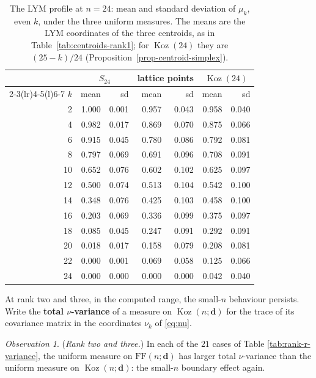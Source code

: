 \documentclass[11pt, a4paper, abstract=yes]{scrartcl}
\theoremstyle{definition}
\theoremstyle{remark}
\theoremstyle{plain}
\newcommand{\vek}[1]{\boldsymbol{#1}}
\theoremstyle{remark}
\newtheorem{observation}[definition]{Observation}
\theoremstyle{plain}
\newcommand{\Koz}{\operatorname{Koz}}
\newcommand{\FF}{\mathrm{FF}}
\begin{document}
\begin{table}[htbp]\centering\small
\begin{tabular}{@{}rrrrrrr@{}}
\toprule
 & \multicolumn{2}{c}{\(S_{24}\)} & \multicolumn{2}{c}{lattice points} & \multicolumn{2}{c}{\(\Koz(24)\)}\\
\cmidrule(lr){2-3}\cmidrule(lr){4-5}\cmidrule(l){6-7}
\(k\) & mean & sd & mean & sd & mean & sd\\
\midrule
2 & 1.000 & 0.001 & 0.957 & 0.043 & 0.958 & 0.040\\
4 & 0.982 & 0.017 & 0.869 & 0.070 & 0.875 & 0.066\\
6 & 0.915 & 0.045 & 0.780 & 0.086 & 0.792 & 0.081\\
8 & 0.797 & 0.069 & 0.691 & 0.096 & 0.708 & 0.091\\
10 & 0.652 & 0.076 & 0.602 & 0.102 & 0.625 & 0.097\\
12 & 0.500 & 0.074 & 0.513 & 0.104 & 0.542 & 0.100\\
14 & 0.348 & 0.076 & 0.425 & 0.103 & 0.458 & 0.100\\
16 & 0.203 & 0.069 & 0.336 & 0.099 & 0.375 & 0.097\\
18 & 0.085 & 0.045 & 0.247 & 0.091 & 0.292 & 0.091\\
20 & 0.018 & 0.017 & 0.158 & 0.079 & 0.208 & 0.081\\
22 & 0.000 & 0.001 & 0.069 & 0.058 & 0.125 & 0.066\\
24 & 0.000 & 0.000 & 0.000 & 0.000 & 0.042 & 0.040\\
\bottomrule
\end{tabular}
\caption{The LYM profile at \(n=24\): mean and standard deviation of \(\mu_k\), even \(k\),
under the three uniform measures. The means are the LYM coordinates of the three centroids, as in
Table~\ref{tab:centroids-rank1}; for \(\Koz(24)\) they are \((25-k)/24\)
(Proposition~\ref{prop-centroid-simplex}).}
\label{tab:profile-n24}
\end{table}

At rank two and three, in the computed range, the small-\(n\) behaviour persists. Write the \textbf{total
\(\nu\)-variance} of a measure on \(\Koz(n;\vek d)\) for the trace of its covariance matrix in the
coordinates \(\nu_k\) of \eqref{eq:nu}.

\begin{observation}
(\emph{Rank two and three.}) In each of the \(21\) cases of Table \ref{tab:rank-r-variance}, the uniform
measure on \(\FF(n;\vek d)\) has larger total \(\nu\)-variance than the uniform measure on
\(\Koz(n;\vek d)\): the small-\(n\) boundary effect again.
\label{obs-moments-rank-r}
\end{observation}
\end{document}
